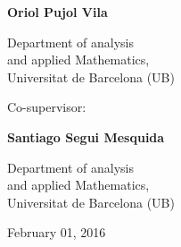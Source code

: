 \begin{titlepage}
\begin{center}
\begin{multicols}{2}
		
		\medskip %
		
		{\Large\bf Oriol Pujol Vila}
		
		\medskip %
		
		{Department of analysis\\
			and applied Mathematics,\\
			 Universitat de Barcelona (UB)}
		
		\medskip
		
		{\large Co-supervisor:}
		
		\medskip
				
		{\Large\bf Santiago Segui Mesquida}
			
		\medskip %

		{Department of analysis\\
			and applied Mathematics,\\
			Universitat de Barcelona (UB)}
		\end{multicols}
		\medskip\medskip\medskip\medskip\medskip
		
		
		February 01, 2016
	\end{center}
	
\end{titlepage}